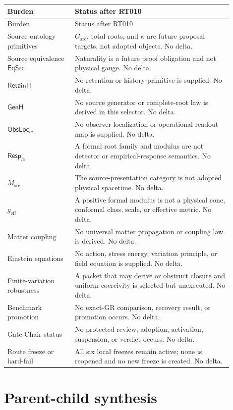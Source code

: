 \documentclass[11pt]{article}
\newcommand{\EqSrc}{\mathsf{EqSrc}}
\begin{document}
\begin{longtable}{P{0.27\linewidth}P{0.63\linewidth}}
\toprule
Burden & Status after RT010 \\
\midrule
\endfirsthead
\toprule
Burden & Status after RT010 \\
\midrule
\endhead
Source ontology primitives & \(G_{\mathrm{src}}\), total roots, and
\(\kappa\) are future proposal targets, not adopted objects.  No delta.\\
Source equivalence \(\EqSrc\) & Naturality is a future proof obligation and
not physical gauge.  No delta.\\
\(\mathsf{RetainH}\) & No retention or history primitive is supplied.  No
delta.\\
\(\mathsf{GenH}\) & No source generator or complete-root law is derived in
this selector.  No delta.\\
\(\mathsf{ObsLoc}_{lc}\) & No observer-localization or operational readout
map is supplied.  No delta.\\
\(\mathsf{Resp}_{lc}\) & A formal root family and modulus are not detector or
empirical-response semantics.  No delta.\\
\(M_{\mathrm{src}}\) & The source-presentation category is not adopted
physical spacetime.  No delta.\\
\(g_{\mathrm{eff}}\) & A positive formal modulus is not a physical cone,
conformal class, scale, or effective metric.  No delta.\\
Matter coupling & No universal matter propagation or coupling law is derived.
No delta.\\
Einstein equations & No action, stress energy, variation principle, or field
equation is supplied.  No delta.\\
Finite-variation robustness & A packet that may derive or obstruct closure
and uniform coercivity is selected but unexecuted.  No delta.\\
Benchmark promotion & No exact-GR comparison, recovery result, or promotion
occurs.  No delta.\\
Gate Chair status & No protected review, adoption, activation, suspension, or
verdict occurs.  No delta.\\
Route freeze or hard-fail & All six local freezes remain active; none is
reopened and no new freeze is created.  No delta.\\
\bottomrule
\end{longtable}

\section{Parent-child synthesis}
\end{document}
